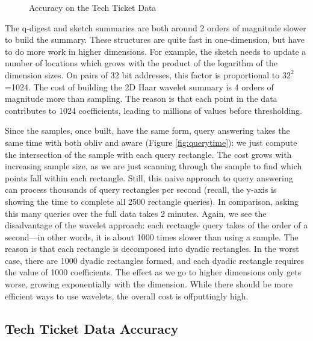 \documentclass[11pt]{article}
\begin{document}
\begin{figure*}[t]
\hspace*{-6mm}
\caption{Accuracy on the Tech Ticket Data}
\label{fig:tech}
\end{figure*}

The q-digest and sketch summaries are both  around 2 orders of
magnitude slower to build the summary. 
These structures are quite fast in one-dimension, but have to do more
work in higher dimensions. 
For example, the sketch needs to update a number of locations which
grows with the product of the logarithm of the dimension sizes. 
On pairs of 32 bit addresses, this factor is proportional to
$32^2$=1024. 
The cost of building the 2D Haar wavelet summary is 4 orders of magnitude
more than sampling. 
The reason is that each point in the data contributes to 1024
coefficients, leading to millions of values before thresholding. 


Since the samples, once built, have the same form, query answering
takes the same time with both obliv and aware (Figure
\ref{fig:querytime}): 
we just compute the
intersection of the sample with each query rectangle. 
The cost grows with increasing sample size, as we are just scanning
through the sample to find which points fall within each rectangle. 
Still, this naive approach to query answering can process thousands of
query rectangles per second (recall, the y-axis is showing the time to
complete all 2500 rectangle queries). 
In comparison, asking this many queries over the full data takes 2 minutes.
Again, we see the disadvantage of the wavelet approach: each rectangle
query takes of the order of a second---in other words, it is about
1000 times slower than using a sample. 
The reason is that each rectangle is decomposed into
dyadic rectangles.
In the worst case, there are 1000 dyadic rectangles formed, and each
dyadic rectangle requires  the value of 1000 coefficients. 
The effect as we go to higher dimensions only gets worse, growing
exponentially with the dimension.
While there should be more efficient ways to use wavelets, the overall
cost is offputtingly high. 

\subsection{Tech Ticket Data Accuracy}
\end{document}
